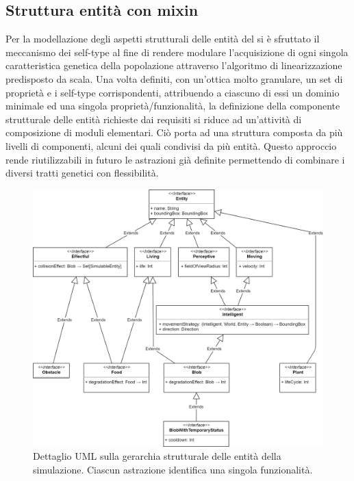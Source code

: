 \subsection{Struttura entità con mixin}
Per la modellazione degli aspetti strutturali delle entità del  si è sfruttato il meccanismo dei self-type al fine di rendere modulare l’acquisizione di ogni singola caratteristica genetica della popolazione attraverso l’algoritmo di linearizzazione predisposto da scala. Una volta definiti, con un’ottica molto granulare, un set di proprietà e i self-type corrispondenti, attribuendo a ciascuno di essi un dominio minimale ed una singola proprietà/funzionalità, la definizione della componente strutturale delle entità richieste dai requisiti si riduce ad un’attività di composizione di moduli elementari. Ciò porta ad una struttura composta da più livelli di componenti, alcuni dei quali condivisi da più entità. Questo approccio rende riutilizzabili in futuro le astrazioni già definite permettendo di combinare i diversi tratti genetici con flessibilità.

\begin{figure}[h!]
\centering
\includegraphics[width=\textwidth, scale=0.44]{img/ModelHierarchy.png}
\caption{Dettaglio UML sulla gerarchia strutturale delle entità della simulazione. Ciascun astrazione identifica una singola funzionalità.}
\label{fig:modelhierarchy3}
\end{figure}

